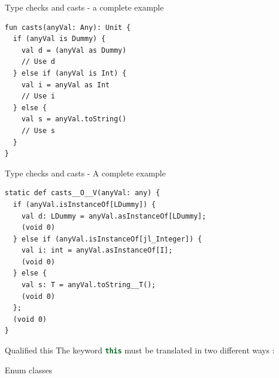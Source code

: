 \documentclass[10pt]{beamer}
\newcommand{\inlinecode}[2]{\colorbox{minted-bg}{\lstinline[language=#1]$#2$}}
\newcommand{\scalainline}[1]{\inlinecode{scala}{#1}}
\newcommand{\ktinline}[1]{\inlinecode{kotlin}{#1}}
\begin{document}
\begin{frame}[fragile]{Type checks and casts - a complete example}
 \begin{verbatim}
fun casts(anyVal: Any): Unit {
  if (anyVal is Dummy) {
    val d = (anyVal as Dummy)
    // Use d
  } else if (anyVal is Int) {
    val i = anyVal as Int
    // Use i
  } else {
    val s = anyVal.toString()
    // Use s
  }
}
 \end{verbatim}
\end{frame}

\begin{frame}[fragile]{Type checks and casts - A complete example}
 \begin{verbatim}
static def casts__O__V(anyVal: any) {
  if (anyVal.isInstanceOf[LDummy]) {
    val d: LDummy = anyVal.asInstanceOf[LDummy];
    (void 0)
  } else if (anyVal.isInstanceOf[jl_Integer]) {
    val i: int = anyVal.asInstanceOf[I];
    (void 0)
  } else {
    val s: T = anyVal.toString__T();
    (void 0)
  };
  (void 0)
}
 \end{verbatim}
\end{frame}

\begin{frame}{Qualified this}
 The keyword \ktinline{this} must be translated in two different ways :
 

\end{frame}


\begin{frame}{Enum classes}
 
\end{frame}
\end{document}
